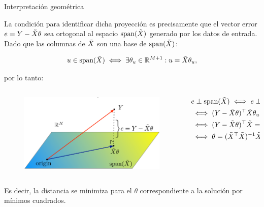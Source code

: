 \documentclass[handout, 9pt]{beamer}
\begin{document}
\begin{frame}{Interpretación geométrica}

La condición para identificar dicha proyección es  precisamente que el vector error $e=Y-\tilde{X} \theta$ sea ortogonal al espacio  $\text{span}(\tilde{X})$ generado por los datos de entrada. Dado que las columnas de $\tilde{X}$ son una base de $\text{span}(\tilde{X})$:

\begin{equation*}
	u\in \text{span}(\tilde{X}) \iff \exists \theta_u\in \mathbb{R}^{M+1}: u=\tilde{X}\theta_u,
\end{equation*}\pause

por lo tanto:

\begin{columns}

\begin{column}{0.5\textwidth}

\begin{figure}[t]
	\centering
	\includegraphics[width=\textwidth]{../img/cap2_intuicionLinReg.pdf}\\
	
	\label{fig:projection}
\end{figure}
	
\end{column}

\begin{column}{0.5\textwidth}


\begin{align*}
	 &e\perp \text{span}(\tilde{X}) \iff e\perp u,\forall u \in \text{span}(\tilde{X})\\
	 & \iff (Y-\tilde{X} \theta)^\top \tilde{X} \theta_u = 0, \forall \theta_u \in \mathbb{R}^{M+1} \nonumber\\
	& \iff (Y-\tilde{X} \theta)^\top \tilde{X}=0\\
	& \iff  \theta = (\tilde{X}^\top\tilde{X})^{-1}\tilde{X}^\top Y
\end{align*}

\end{column}

\end{columns} 

\pause 
\vspace{1em}
Es decir, la distancia se minimiza para el $\theta$ correspondiente a la solución por mínimos cuadrados.
	
\end{frame}
\end{document}
